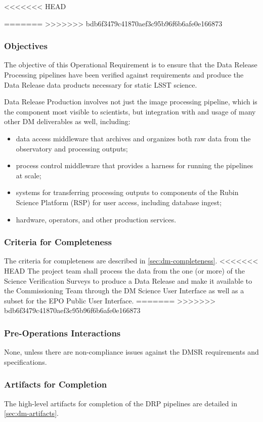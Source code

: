 <<<<<<< HEAD

=======
>>>>>>> bdb6f3479c41870aef3c95b96f6b6afe0e166873
\subsubsection{Objectives}
The objective of this Operational Requirement is to ensure that the Data Release Processing pipelines have been verified against requirements  and produce the Data Release data products necessary for static LSST science. 

Data Release Production involves not just the image processing pipeline,  which is the component most visible to scientists, but integration with and usage of many other DM deliverables as well, including:
\begin{itemize}
\item data access middleware that archives and organizes both raw data from the observatory and processing outputs;
\item process control middleware that provides a harness for running the pipelines at scale;
\item systems for transferring processing outputs to components of the Rubin Science Platform (RSP) for user access, including database ingest;
\item hardware, operators, and other production services.
\end{itemize}

\subsubsection{Criteria for Completeness}
The criteria for completeness are described in \ref{sec:dm-completeness}. 
<<<<<<< HEAD
The project team shall process the data from the one (or more) of the Science Verification Surveys to produce a Data Release and make it available to the Commissioning Team through the DM Science User Interface as well as a subset for the EPO Public User Interface.
=======
>>>>>>> bdb6f3479c41870aef3c95b96f6b6afe0e166873

\subsubsection{Pre-Operations Interactions}
None, unless there are non-compliance issues against the DMSR requirements and specifications.

\subsubsection{Artifacts for Completion}
The high-level artifacts for completion of the DRP pipelines are detailed in \ref{sec:dm-artifacts}.   

